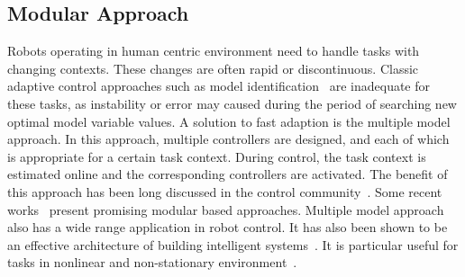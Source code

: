 \subsection{Modular Approach}



Robots operating in human centric environment need to handle tasks with changing contexts. These changes are often rapid or discontinuous. Classic adaptive control approaches such as model identification~\cite{khalil2004modeling} are inadequate for these tasks, as instability or error may caused during the period of searching new optimal model variable values. A solution to fast adaption is the multiple model approach. In this approach, multiple controllers are designed, and each of which is appropriate for a certain task context. During control, the task context is estimated online and the corresponding controllers are activated. The benefit of this approach has been long discussed in the control community~\cite{jacobs1991adaptive,narendra1995adaptation,narendra1997adaptive}. Some recent works~\cite{fekri2007robust,kuipers2010multiple} present promising modular based approaches. Multiple model approach also has a wide range application in robot control. It has also been shown to be an effective architecture of building intelligent systems~\cite{bryson2004modular,BrysonMcG12}. It is particular useful for tasks in nonlinear and non-stationary environment~\cite{petkos2006learning,sugimoto2012emosaic}.




